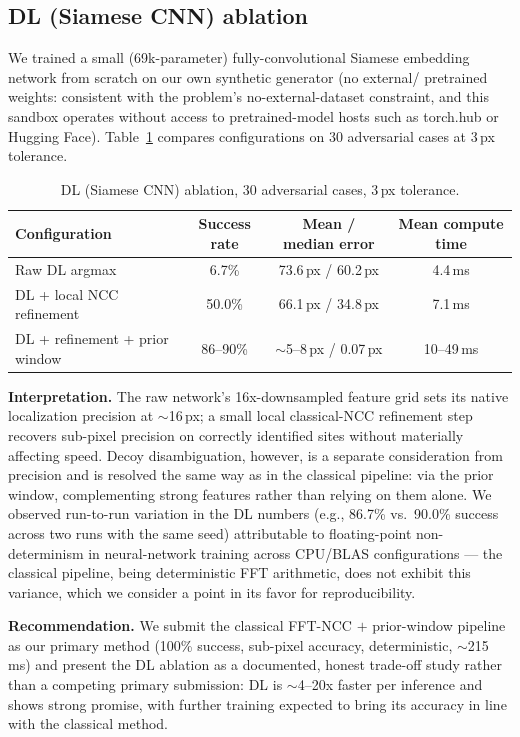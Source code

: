 \documentclass[11pt]{article}
\begin{document}
\subsection{DL (Siamese CNN) ablation}

We trained a small (69k-parameter) fully-convolutional Siamese embedding
network from scratch on our own synthetic generator (no external/
pretrained weights: consistent with the problem's no-external-dataset
constraint, and this sandbox operates without access to pretrained-model
hosts such as torch.hub or Hugging Face). Table~\ref{tab:dl} compares
configurations on 30 adversarial cases at 3\,px tolerance.

\begin{table}[H]
\centering
\caption{DL (Siamese CNN) ablation, 30 adversarial cases, 3\,px tolerance.}
\label{tab:dl}
\begin{tabular}{lccc}
\toprule
Configuration & Success rate & Mean / median error & Mean compute time \\
\midrule
Raw DL argmax & 6.7\% & 73.6\,px / 60.2\,px & 4.4\,ms \\
DL + local NCC refinement & 50.0\% & 66.1\,px / 34.8\,px & 7.1\,ms \\
DL + refinement + prior window & 86--90\% & $\sim$5--8\,px / 0.07\,px & 10--49\,ms \\
\bottomrule
\end{tabular}
\end{table}

\textbf{Interpretation.} The raw network's 16x-downsampled feature grid
sets its native localization precision at $\sim$16\,px; a small local
classical-NCC refinement step recovers sub-pixel precision on correctly
identified sites without materially affecting speed. Decoy
disambiguation, however, is a separate consideration from precision and
is resolved the same way as in the classical pipeline: via the prior
window, complementing strong features rather than relying on them alone.
We observed run-to-run variation in the DL numbers (e.g., 86.7\% vs.\
90.0\% success across two runs with the same seed) attributable to
floating-point non-determinism in neural-network training across
CPU/BLAS configurations --- the classical pipeline, being deterministic
FFT arithmetic, does not exhibit this variance, which we consider a
point in its favor for reproducibility.

\textbf{Recommendation.} We submit the classical FFT-NCC \(+\) prior-window
pipeline as our primary method (100\% success, sub-pixel accuracy,
deterministic, $\sim$215\,ms) and present the DL ablation as a
documented, honest trade-off study rather than a competing primary
submission: DL is $\sim$4--20x faster per inference and shows strong
promise, with further training expected to bring its accuracy in line
with the classical method.
\end{document}
